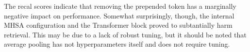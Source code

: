 The recal scores indicate that removing the prepended token has a marginally negative impact on performance.
Somewhat surprisingly, though, the internal MHSA configuration and the Transformer block proved to subtantially harm retrieval.
This may be due to a lack of robust tuning, but it should be noted that average pooling has not hyperparameters itself and does not require tuning.





